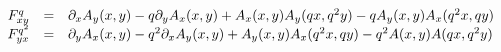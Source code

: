 \begin{equation}
\begin{array}{ccl}
F_{xy}^q &=&\partial _xA_y(x,y)-q\partial _yA_x(x,y)+
A_x(x,y)A_y(qx,q^2y)-qA_y(x,y)A_x(q^2x,qy) \cr
F_{yx}^{q^2}&=&\partial _yA_x(x,y)-q^2\partial _xA_y(x,y)+
A_y(x,y)A_x(q^2x,qy)-q^2A(x,y)A(qx,q^2y)  \cr
\end{array}
\end{equation}

